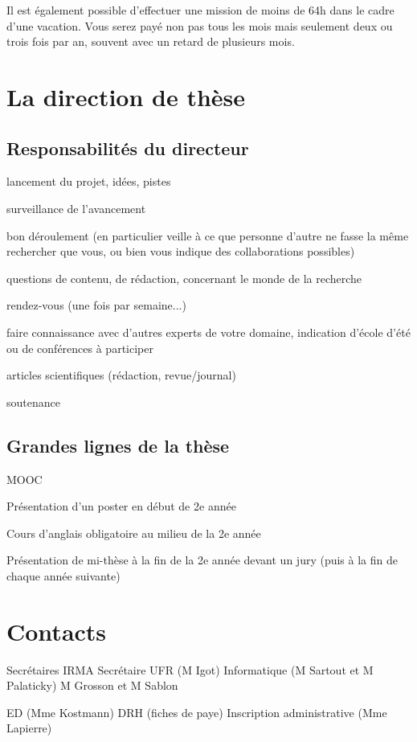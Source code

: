 \documentclass[a5paper]{article}
\begin{document}
Il est également possible d'effectuer une mission de moins de 64h dans le cadre d'une vacation. Vous serez payé non pas tous les mois mais seulement deux ou trois fois par an, souvent avec un retard de plusieurs mois.


\section{La direction de thèse}
\label{sec:direction-these}

\subsection{Responsabilités du directeur}

lancement du projet, idées, pistes

surveillance de l'avancement

bon déroulement (en particulier veille à ce que personne d'autre ne fasse la même rechercher que vous, ou bien vous indique des collaborations possibles)

questions de contenu, de rédaction, concernant le monde de la recherche

rendez-vous (une fois par semaine...)

faire connaissance avec d'autres experts de votre domaine, indication d'école d'été ou de conférences à participer

articles scientifiques (rédaction, revue/journal)

soutenance


\subsection{Grandes lignes de la thèse}

MOOC

Présentation d'un poster en début de 2e année

Cours d'anglais obligatoire au milieu de la 2e année

Présentation de mi-thèse à la fin de la 2e année devant un jury (puis à la fin de chaque année suivante)




\appendix


\section{Contacts}
\label{sec:contacts}

Secrétaires IRMA
Secrétaire UFR (M Igot)
Informatique (M Sartout et M Palaticky)
M Grosson et M Sablon

ED (Mme Kostmann)
DRH (fiches de paye)
Inscription administrative (Mme Lapierre)
\end{document}
